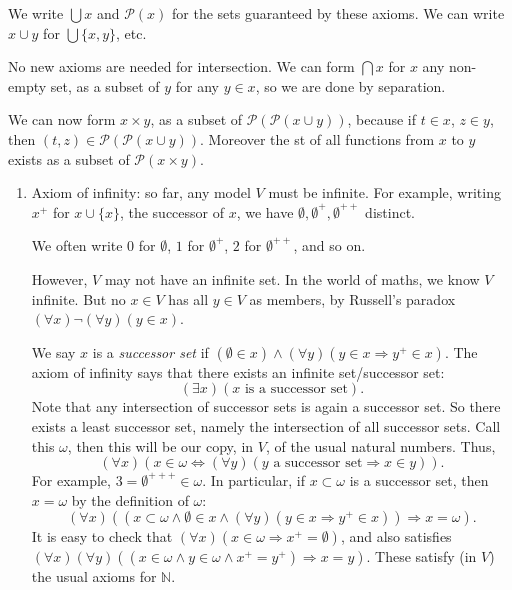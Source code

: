 \documentclass[12pt]{article}
\begin{document}
We write $\bigcup x$ and $\mathcal{P}(x)$ for the sets guaranteed by these axioms. We can write $x \cup y$ for $\bigcup \{x, y\}$, etc.

No new axioms are needed for intersection. We can form $\bigcap x$ for $x$ any non-empty set, as a subset of $y$ for any $y \in x$, so we are done by separation.

We can now form $x \times y$, as a subset of $\mathcal{P}(\mathcal{P}(x \cup y))$, because if $t \in x$, $z \in y$, then $(t, z) \in \mathcal{P}(\mathcal{P}(x \cup y))$. Moreover the st of all functions from $x$ to $y$ exists as a subset of $\mathcal{P}(x \times y)$.

\begin{enumerate}[resume]
	\item Axiom of infinity: so far, any model $V$ must be infinite. For example, writing $x^{+}$ for $x \cup \{x\}$, the successor of $x$, we have $\emptyset, \emptyset^{+}, \emptyset^{++}$ distinct.

		We often write $0$ for $\emptyset$, $1$ for $\emptyset^{+}$, $2$ for $\emptyset^{++}$, and so on.

		However, $V$ may not have an infinite set. In the world of maths, we know $V$ infinite. But no $x \in V$ has all $y \in V$ as members, by Russell's paradox $(\forall x)\neg (\forall y)(y \in x)$.

		We say $x$ is a \emph{successor set} if $(\emptyset \in x) \wedge (\forall y)(y \in x \Rightarrow y^{+} \in x)$. The axiom of infinity says that there exists an infinite set/successor set:
		\[
		(\exists x)(x \text{ is a successor set}).
		\]
		Note that any intersection of successor sets is again a successor set. So there exists a least successor set, namely the intersection of all successor sets. Call this $\omega$, then this will be our copy, in $V$, of the usual natural numbers. Thus,
		\[
			(\forall x)(x \in \omega \iff (\forall y)(y \text{ a successor set} \Rightarrow x \in y)).
		\]
		For example, $3 = \emptyset^{+++} \in \omega$. In particular, if $x \subset \omega$ is a successor set, then $x = \omega$ by the definition of $\omega$:
		\[
			(\forall x)((x \subset \omega \wedge \emptyset \in x \wedge  (\forall y)(y \in x \Rightarrow y^{+} \in x)) \Rightarrow x = \omega).
		\]
		It is easy to check that $(\forall x)(x \in \omega \Rightarrow x^{+} = \emptyset)$, and also satisfies $(\forall x)(\forall y)((x \in \omega \wedge y \in \omega \wedge x^{+} = y^{+}) \Rightarrow x = y)$. These satisfy (in $V$) the usual axioms for $\mathbb{N}$.


\end{enumerate}
\end{document}
